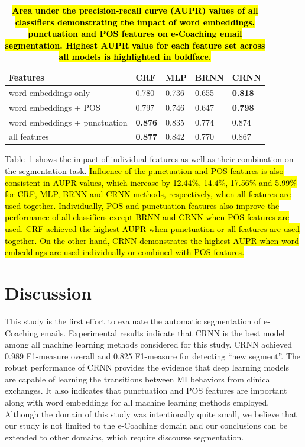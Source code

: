 \documentclass{amia}
\begin{document}
\begin{table}[ht]
\centering
\caption{\textbf{\hl{Area under the precision-recall curve (AUPR) values of all classifiers demonstrating the impact of word embeddings, punctuation and POS features on e-Coaching email segmentation. Highest AUPR value for each feature set across all models is highlighted in boldface.}}}
\label{tab:result_aupr}
 \begin{tabular}{|l|l|l|l|l|}
  \hline
\textbf{Features} & \textbf{CRF} & \textbf{MLP}  & \textbf{BRNN} & \textbf{CRNN} \\ \hline      
 word embeddings only & 0.780 & 0.736 & 0.655 & \textbf{0.818} \\ \hline
 word embeddings + POS & 0.797 & 0.746 & 0.647 & \textbf{0.798} \\ \hline
 word embeddings + punctuation & \textbf{0.876} & 0.835 & 0.774 & 0.874 \\ \hline
 all features & \textbf{0.877} & 0.842 & 0.770 & 0.867 \\ \hline
  \end{tabular}
\end{table}     

Table~\ref{tab:result_aupr} shows the impact of individual features as well as their combination on the segmentation task. \hl{Influence of the punctuation and POS features is also consistent in AUPR values, which increase by 12.44\%, 14.4\%, 17.56\% and 5.99\% for CRF, MLP, BRNN and CRNN methods, respectively, when all features are used together. Individually, POS and punctuation features also improve the performance of all classifiers except BRNN and CRNN when POS features are used. CRF achieved the highest AUPR when punctuation or all features are used together. On the other hand, CRNN demonstrates the highest AUPR when word embeddings are used individually or combined with POS features.}

\section*{Discussion}
This study is the first effort to evaluate the automatic segmentation of e-Coaching emails. Experimental results indicate that CRNN is the best model among all machine learning methods considered for this study. CRNN achieved 0.989 F1-measure overall and 0.825 F1-measure for detecting ``new segment''. The robust performance of CRNN provides the evidence that deep learning models are capable of learning the transitions between MI behaviors from clinical exchanges. It also indicates that punctuation and POS features are important along with word embeddings for all machine learning methods employed. Although the domain of this study was intentionally quite small, we believe that our study is not limited to the e-Coaching domain and our conclusions can be extended to other domains, which require discourse segmentation.
\end{document}
